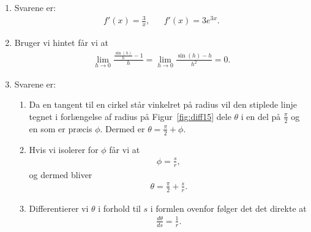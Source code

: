 \begin{enumerate}
	\item Svarene er:
	\begin{align*}
	f'(x)=\frac{3}{x},&& f'(x)=3e^{3x}.
	\end{align*}
	
	\item \label{it:diff14}	Bruger vi hintet får vi at
	\begin{align*}
	\lim_{h\to 0} \frac{\frac{\sin(h)}{h}-1}{h}=\lim_{h\to 0} \frac{\sin(h)-h}{h^2}=0.
	\end{align*}
	
	\item\label{it:diff15} Svarene er:	
	\begin{enumerate}
		\item Da en tangent til en cirkel står vinkelret på radius vil den stiplede linje tegnet i forlængelse af radius på Figur~\ref{fig:diff15} dele $\theta$ i en del på $\frac{\pi}{2}$ og en som er præcis $\phi$. Dermed er $\theta=\frac{\pi}{2}+\phi$.
		\item Hvis vi isolerer for $\phi$ får vi at 
		\begin{align*}
		\phi=\frac{s}{r},
		\end{align*}
		og dermed bliver
		\begin{align*}
		\theta=\frac{\pi}{2}+\frac{s}{r}.
		\end{align*}
		
		\item Differentierer vi $ \theta $ i forhold til $s$ i formlen ovenfor følger det det direkte at
		\begin{align*}
		\frac{d \theta}{d s}= \frac{1}{r}.
		\end{align*}
	\end{enumerate}
	



\end{enumerate}
